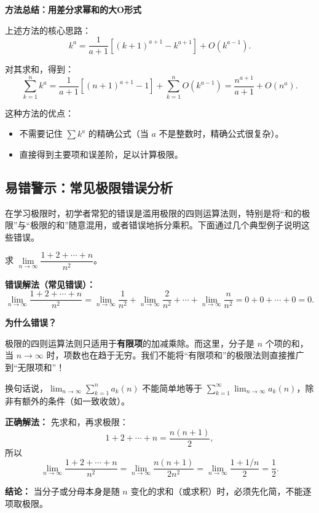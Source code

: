 \documentclass[fontset=fandol]{ctexart}
\newenvironment{custom}[1]{\par\noindent\textbf{#1}\quad}{\par\vspace{0.8em}}
\begin{document}
\begin{custom}{方法总结：用差分求幂和的大O形式}

上述方法的核心思路：
\[
k^a = \dfrac{1}{a+1} \left[(k+1)^{a+1} - k^{a+1}\right] + O(k^{a-1}).
\]

对其求和，得到：
\[
\sum_{k=1}^n k^a = \dfrac{1}{a+1} \left[(n+1)^{a+1} - 1\right] + \sum_{k=1}^n O(k^{a-1}) = \dfrac{n^{a+1}}{a+1} + O(n^a).
\]

这种方法的优点：
\begin{itemize}
\item 不需要记住 \(\sum k^a\) 的精确公式（当 \(a\) 不是整数时，精确公式很复杂）。
\item 直接得到主要项和误差阶，足以计算极限。
\end{itemize}
\end{custom}

\subsection{易错警示：常见极限错误分析}

在学习极限时，初学者常犯的错误是滥用极限的四则运算法则，特别是将“和的极限”与“极限的和”随意混用，或者错误地拆分乘积。下面通过几个典型例子说明这些错误。

\begin{example}[错误：滥用极限的四则运算法则]
求 \(\lim\limits_{n\to\infty} \dfrac{1 + 2 + \cdots + n}{n^2}\)。

\textbf{错误解法（常见错误）：}
\[
\lim_{n\to\infty} \dfrac{1 + 2 + \cdots + n}{n^2} = \lim_{n\to\infty} \dfrac{1}{n^2} + \lim_{n\to\infty} \dfrac{2}{n^2} + \cdots + \lim_{n\to\infty} \dfrac{n}{n^2} = 0 + 0 + \cdots + 0 = 0.
\]

\textbf{为什么错误？}

极限的四则运算法则只适用于\textbf{有限项}的加减乘除。而这里，分子是 \(n\) 个项的和，当 \(n \to \infty\) 时，项数也在趋于无穷。我们不能将“有限项和”的极限法则直接推广到“无限项和”！

换句话说，\(\lim_{n\to\infty} \sum_{k=1}^{n} a_k(n)\) 不能简单地等于 \(\sum_{k=1}^{\infty} \lim_{n\to\infty} a_k(n)\)，除非有额外的条件（如一致收敛）。

\textbf{正确解法：}
先求和，再求极限：
\[
1 + 2 + \cdots + n = \dfrac{n(n+1)}{2},
\]
所以
\[
\lim_{n\to\infty} \dfrac{1 + 2 + \cdots + n}{n^2} = \lim_{n\to\infty} \dfrac{n(n+1)}{2n^2} = \lim_{n\to\infty} \dfrac{1 + 1/n}{2} = \dfrac{1}{2}.
\]

\textbf{结论：} 当分子或分母本身是随 \(n\) 变化的求和（或求积）时，必须先化简，不能逐项取极限。
\end{example}
\end{document}
